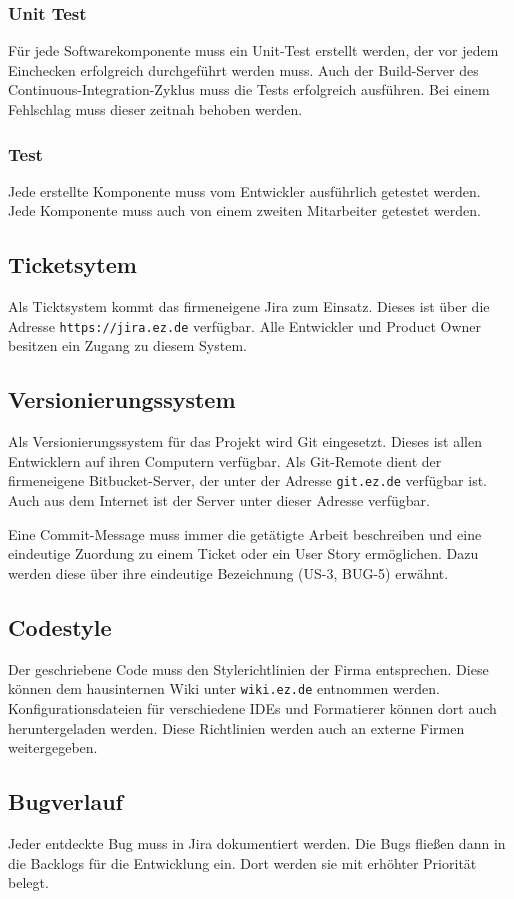 \subsubsection{Unit Test}
Für jede Softwarekomponente muss ein Unit-Test erstellt werden, der vor jedem Einchecken erfolgreich durchgeführt werden muss. Auch der Build-Server des Continuous-Integration-Zyklus muss die Tests erfolgreich ausführen. Bei einem Fehlschlag muss dieser zeitnah behoben werden.
\subsubsection{Test}
Jede erstellte Komponente muss vom Entwickler ausführlich getestet werden. Jede Komponente muss auch von einem zweiten Mitarbeiter getestet werden.
\subsection{Ticketsytem}
Als Ticktsystem kommt das firmeneigene Jira zum Einsatz. Dieses ist über die Adresse \texttt{https://jira.ez.de} verfügbar. Alle Entwickler und Product Owner besitzen ein Zugang zu diesem System.
\subsection{Versionierungssystem}
Als Versionierungssystem für das Projekt wird Git eingesetzt. Dieses ist allen Entwicklern auf ihren Computern verfügbar. Als Git-Remote dient der firmeneigene Bitbucket-Server, der unter der Adresse \texttt{git.ez.de} verfügbar ist. Auch aus dem Internet ist der Server unter dieser Adresse verfügbar.

Eine Commit-Message muss immer die getätigte Arbeit beschreiben und eine eindeutige Zuordung zu einem Ticket oder ein User Story ermöglichen. Dazu werden diese über ihre eindeutige Bezeichnung (US-3, BUG-5) erwähnt.
\subsection{Codestyle}
Der geschriebene Code muss den Stylerichtlinien der Firma entsprechen. Diese können dem hausinternen Wiki unter \texttt{wiki.ez.de} entnommen werden. Konfigurationsdateien für verschiedene IDEs und Formatierer können dort auch heruntergeladen werden. Diese Richtlinien werden auch an externe Firmen weitergegeben. 
\subsection{Bugverlauf}
Jeder entdeckte Bug muss in Jira dokumentiert werden. Die Bugs fließen dann in die Backlogs für die Entwicklung ein. Dort werden sie mit erhöhter Priorität belegt.



